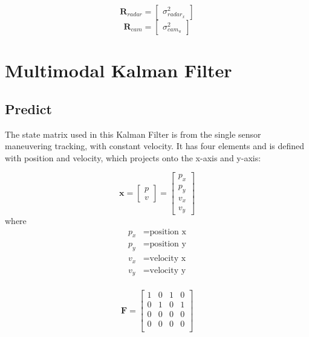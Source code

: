 \begin{equation}\label{equ:2-radar_R}
    \mathbf{R}_{radar} = 
    \begin{bmatrix}
        \sigma_{radar_x}^2 
      \end{bmatrix}
\end{equation}
\begin{equation}\label{equ:2-R_cam}
    \mathbf{R}_{cam} = 
    \begin{bmatrix}
        \sigma_{cam_u}^2
    \end{bmatrix}
\end{equation}


\section{Multimodal Kalman Filter}\label{sec:2-kalman_filter}
\subsection{Predict}\label{sec:2-predict}
The state matrix used in this Kalman Filter is from the single sensor maneuvering tracking, with constant velocity.
It has four elements and is defined with position and velocity, which projects onto the x-axis and y-axis:

\begin{equation}\label{equ:state_eq}
    \mathbf{x} = 
        \begin{bmatrix} 
        p \\ 
        v 
        \end{bmatrix} = 
        \begin{bmatrix} 
        p_x \\ 
        p_y \\ 
        v_x \\ 
        v_y 
        \end{bmatrix}
\end{equation}
where
\begin{align*}
    p_x &=\text{position x}\\
    p_y &=\text{position y}\\
    v_x &=\text{velocity x}\\
    v_y &=\text{velocity y}\\
\end{align*}

\begin{equation}\label{equ:transition_matrix_H}
    \mathbf{F} = 
    \begin{bmatrix}
        1 & 0 & 1 & 0 \\
        0 & 1 & 0 & 1 \\
        0 & 0 & 0 & 0 \\
        0 & 0 & 0 & 0 \\
      \end{bmatrix}
\end{equation}

